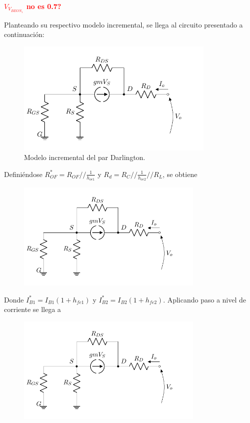 \begin{center}
	\LARGE{\textcolor{red}{\textbf{$V_{V_{BEON_1}}$ no es 0.7?}}}
\end{center}

Planteando su respectivo modelo incremental, se llega al circuito presentado a continuación: 
\begin{figure}[H]
\centering
	\includegraphics[width=0.85\textwidth, page=3]{Imagenes/ModeloIncremental.pdf}
	\caption{Modelo incremental del par Darlington.}
\label{fig:incdar}
\end{figure}

Definiéndose $R_{OF}^* = R_{OF} // \frac{1}{h_{oe1}}$ y $R_d = R_C // \frac{1}{h_{oe2}} // R_L$, se obtiene
\begin{figure}[H]
\centering
	\includegraphics[width=0.8\textwidth, page=4]{Imagenes/ModeloIncremental.pdf}
\end{figure}

Donde $I_{B1}^* = I_{B1} \left( 1 + h_{fe1} \right)$ y $I_{B2}^* = I_{B2} \left( 1 + h_{fe2} \right)$. Aplicando paso a nivel de corriente se llega a
\begin{figure}[H]
\centering
	\includegraphics[width=0.8\textwidth, page=5]{Imagenes/ModeloIncremental.pdf}
\end{figure}

